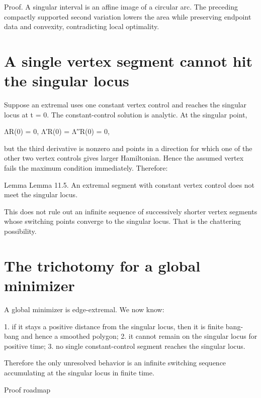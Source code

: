 \begin{prooftext}
Proof. A singular interval is an affine image of a circular arc. The preceding compactly supported second variation lowers the area while preserving endpoint data and convexity, contradicting local optimality.
\end{prooftext}

\section{A single vertex segment cannot hit the singular locus}

Suppose an extremal uses one constant vertex control and reaches the singular locus at t = 0. The constant-control solution is analytic. At the singular point,


\begin{displaytext}
ΛR(0) = 0, Λ′R(0) = Λ′′R(0) = 0,
\end{displaytext}

but the third derivative is nonzero and points in a direction for which one of the other two vertex controls gives larger Hamiltonian. Hence the assumed vertex fails the maximum condition immediately. Therefore:


\begin{statementbox}{Lemma}
Lemma 11.5. An extremal segment with constant vertex control does not meet the singular locus.
\end{statementbox}

This does not rule out an infinite sequence of successively shorter vertex segments whose switching points converge to the singular locus. That is the chattering possibility.


\section{The trichotomy for a global minimizer}

A global minimizer is edge-extremal. We now know:


1. if it stays a positive distance from the singular locus, then it is finite bang-bang and hence a smoothed polygon; 2. it cannot remain on the singular locus for positive time; 3. no single constant-control segment reaches the singular locus.


Therefore the only unresolved behavior is an infinite switching sequence accumulating at the singular locus in finite time.


\begin{insightbox}{Proof roadmap}
\end{insightbox}

